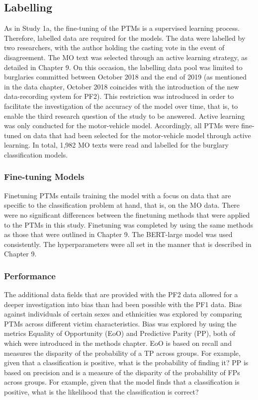 \subsection{Labelling} As in Study 1a, the fine-tuning of the PTMs is a supervised learning process. Therefore, labelled data are required for the models. The data were labelled by two researchers, with the author holding the casting vote in the event of disagreement. The MO text was selected through an active learning strategy, as detailed in Chapter 9. On this occasion, the labelling data pool was limited to burglaries committed between October 2018 and the end of 2019 (as mentioned in the data chapter, October 2018 coincides with the introduction of the new data-recording system for PF2). This restriction was introduced in order to facilitate the investigation of the accuracy of the model over time, that is, to enable the third research question of the study to be answered. Active learning was only conducted for the motor-vehicle model. Accordingly, all PTMs were fine-tuned on data that had been selected for the motor-vehicle model through active learning. In total, 1,982 MO texts were read and labelled for the burglary classification models.

\subsubsection{Fine-tuning Models} Finetuning PTMs entails training the model with a focus on data that are specific to the classification problem at hand, that is, on the MO data. There were no significant differences between the finetuning methods that were applied to the PTMs in this study. Finetuning was completed by using the same methods as those that were outlined in Chapter 9. The BERT-large model was used consistently. The hyperparameters were all set in the manner that is described in Chapter 9.

\subsubsection{Performance} The additional data fields that are provided with the PF2 data allowed for a deeper investigation into bias than had been possible with the PF1 data. Bias against individuals of certain sexes and ethnicities was explored by comparing PTMs across different victim characteristics. Bias was explored by using the metrics Equality of Opportunity (EoO) and Predictive Parity (PP), both of which were introduced in the methods chapter. EoO is based on recall and measures the disparity of the probability of a TP across groups. For example, given that a classification is positive, what is the probability of finding it? PP is based on precision and is a measure of the disparity of the probability of FPs across groups. For example, given that the model finds that a classification is positive, what is the likelihood that the classification is correct?

